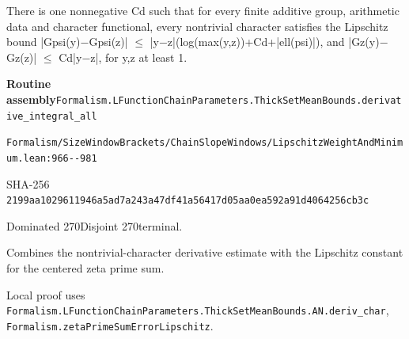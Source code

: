 
\begin{formalstatement}[D562]\label{decomp:D562}
There is one nonnegative Cd such that for every finite additive group, arithmetic data and character functional, every nontrivial character satisfies the Lipschitz bound |Gpsi(y)\ensuremath{-}Gpsi(z)| \ensuremath{\le} |y\ensuremath{-}z|(log(max(y,z))+Cd+|ell(psi)|), and |Gz(y)\ensuremath{-}Gz(z)| \ensuremath{\le} Cd|y\ensuremath{-}z|, for y,z at least 1.
\end{formalstatement}
{\small\raggedright\noindent\textsf{\bfseries Routine assembly}\quad \nolinkurl{Formalism.LFunctionChainParameters.ThickSetMeanBounds.derivative_integral_all}\par\noindent \nolinkurl{Formalism/SizeWindowBrackets/ChainSlopeWindows/LipschitzWeightAndMinimum.lean:966--981}\par\noindent SHA-256 \nolinkurl{2199aa1029611946a5ad7a243a47df41a56417d05aa0ea592a91d4064256cb3c}\par\noindent Dominated 270\quad Disjoint 270\quad terminal.\par}
Combines the nontrivial-character derivative estimate with the Lipschitz constant for the centered zeta prime sum.
{\small\raggedright Local proof uses \nolinkurl{Formalism.LFunctionChainParameters.ThickSetMeanBounds.AN.deriv_char}, \nolinkurl{Formalism.zetaPrimeSumErrorLipschitz}.\par}
